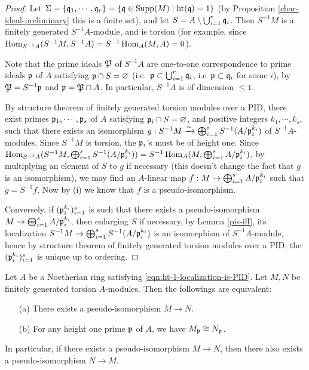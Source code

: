 \begin{proof}
Let
$\Sigma=\{{\mathfrak{q}}_1,\cdots,{\mathfrak{q}}_r\}=\{{\mathfrak{q}}\in{\mathrm{Supp}}(M)\mid{\mathrm{ht}}({\mathfrak{q}})=1\}$
(by Proposition \ref{char-ideal-preliminary} this is a finite set),
and let $S=A\setminus\bigcup_{i=1}^r{\mathfrak{q}}_i$.
Then $S^{-1}M$ is a finitely generated $S^{-1}A$-module,
and is torsion (for example, since $\operatorname{Hom}_{S^{-1}A}(S^{-1}M,S^{-1}A)
=S^{-1}\operatorname{Hom}_A(M,A)=0$).

Note that the prime ideals ${\mathfrak{P}}$ of $S^{-1}A$ are one-to-one correspondence
to prime ideals ${\mathfrak{p}}$ of $A$ satisfying ${\mathfrak{p}}\cap S=\varnothing$
(i.e.~${\mathfrak{p}}\subset\bigcup_{i=1}^r{\mathfrak{q}}_i$, i.e~${\mathfrak{p}}\subset{\mathfrak{q}}_i$ for some $i$),
by ${\mathfrak{P}}=S^{-1}{\mathfrak{p}}$ and ${\mathfrak{p}}={\mathfrak{P}}\cap A$.
In particular, $S^{-1}A$ is of dimension $\leq 1$.

By structure theorem of finitely generated torsion modules over a PID,
there exist primes ${\mathfrak{p}}_1,\cdots,{\mathfrak{p}}_s$ of $A$
satisfying ${\mathfrak{p}}_i\cap S=\varnothing$,
and positive integers $k_1,\cdots,k_s$, such that
there exists an isomorphism
$g:S^{-1}M\xrightarrow\sim\bigoplus_{i=1}^sS^{-1}(A/{\mathfrak{p}}_i^{k_i})$
of $S^{-1}A$-modules.
Since $S^{-1}M$ is torsion, the ${\mathfrak{p}}_i$'s must be of height one.
Since $\operatorname{Hom}_{S^{-1}A}(S^{-1}M,\bigoplus_{i=1}^sS^{-1}(A/{\mathfrak{p}}_i^{k_i}))
=S^{-1}\operatorname{Hom}_A(M,\bigoplus_{i=1}^sA/{\mathfrak{p}}_i^{k_i})$,
by multiplying an element of $S$ to $g$ if necessary
(this doesn't change the fact that $g$ is an isomorphism), we may find
an $A$-linear map $f:M\to\bigoplus_{i=1}^sA/{\mathfrak{p}}_i^{k_i}$
such that $g=S^{-1}f$.
Now by (i) we know that $f$ is a pseudo-isomorphism.

Conversely, if $({\mathfrak{p}}_i^{k_i})_{i=1}^s$ is such that there exists a
pseudo-isomorphism
$M\to\bigoplus_{i=1}^s A/{\mathfrak{p}}_i^{k_i}$,
then enlarging $S$ if necessary, by Lemma \ref{pis-iff},
its localization
$S^{-1}M\to\bigoplus_{i=1}^sS^{-1}(A/{\mathfrak{p}}_i^{k_i})$
is an isomorphism of $S^{-1}A$-module, hence by
structure theorem of finitely generated torsion modules over a PID,
the $({\mathfrak{p}}_i^{k_i})_{i=1}^s$ is unique up to ordering.
\end{proof}

\begin{prop}
\label{pis-symm}
\leanok
Let $A$ be a Noetherian ring satisfying \eqref{eqn:ht-1-localization-is-PID}.
Let $M,N$ be finitely generated torsion $A$-modules.
Then the followings are equivalent:
\begin{itemize}
\item[(a)]
There exists a pseudo-isomorphism $M\to N$.
\item[(b)]
For any height one prime ${\mathfrak{p}}$ of $A$, we have $M_{\mathfrak{p}}\cong N_{\mathfrak{p}}$.
\end{itemize}
In particular, if there exists a pseudo-isomorphism $M\to N$,
then there also exists a pseudo-isomorphism $N\to M$.
\end{prop}

